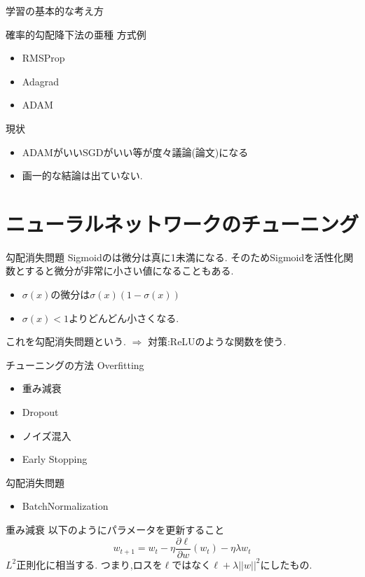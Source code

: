 \begin{frame}[fragile]{学習の基本的な考え方}
\begin{frame}[fragile]{確率的勾配降下法の亜種}
方式例
\begin{itemize}
  \item RMSProp
  \item Adagrad
  \item ADAM
\end{itemize}
現状
\begin{itemize}
  \item ADAMがいいSGDがいい等が度々議論(論文)になる
  \item 画一的な結論は出ていない.
\end{itemize}

\section{ニューラルネットワークのチューニング}

\begin{frame}{勾配消失問題}
Sigmoidのは微分は真に1未満になる.
そのためSigmoidを活性化関数とすると微分が非常に小さい値になることもある.
\begin{itemize}
  \item  $\sigma(x)$の微分は$\sigma(x)(1 - \sigma(x))$
  \item $\sigma(x) < 1$よりどんどん小さくなる.
\end{itemize}
これを勾配消失問題という.
$\Rightarrow$ 対策:ReLUのような関数を使う.
\end{frame}


\begin{frame}[fragile]{チューニングの方法}
Overfitting
\begin{itemize}
  \item 重み減衰
  \item Dropout
  \item ノイズ混入
  \item Early Stopping
\end{itemize}
勾配消失問題
\begin{itemize}
  \item BatchNormalization
\end{itemize}
\end{frame}


\begin{frame}[fragile]{重み減衰}
以下のようにパラメータを更新すること
\begin{equation*}
  w_{t+1} =  w_{t} - \eta \frac{\partial \ell}{\partial w}(w_t) - \eta \lambda w_t
\end{equation*}
$L^2$正則化に相当する.
つまり,ロスを$\ell$ではなく$\ell + \lambda ||w||^2$にしたもの.



\end{frame}
\end{frame}
\end{frame}
